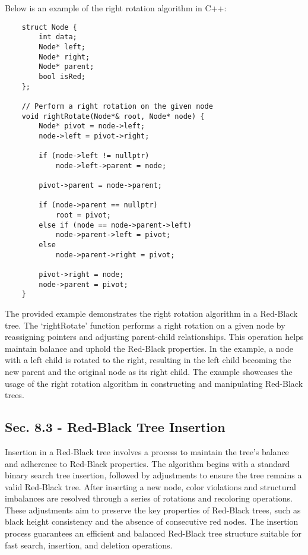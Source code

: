 \begin{solution}

    Below is an example of the right rotation algorithm in C++:

    \horizontalline

    \begin{verbatim}
    struct Node {
        int data;
        Node* left;
        Node* right;
        Node* parent;
        bool isRed;
    };
    
    // Perform a right rotation on the given node
    void rightRotate(Node*& root, Node* node) {
        Node* pivot = node->left;
        node->left = pivot->right;
    
        if (node->left != nullptr)
            node->left->parent = node;
    
        pivot->parent = node->parent;
    
        if (node->parent == nullptr)
            root = pivot;
        else if (node == node->parent->left)
            node->parent->left = pivot;
        else
            node->parent->right = pivot;
    
        pivot->right = node;
        node->parent = pivot;
    }
    \end{verbatim}

    \horizontalline
    
    The provided example demonstrates the right rotation algorithm in a Red-Black tree. The `rightRotate' function performs a right rotation on a given node by reassigning pointers and adjusting parent-child relationships. This operation helps maintain balance and uphold the Red-Black properties. In the example, a node with a left 
    child is rotated to the right, resulting in the left child becoming the new parent and the original node as its right child. The example showcases the usage of the right rotation algorithm in constructing and manipulating Red-Black trees.
\end{solution}

\subsection*{Sec. 8.3 - Red-Black Tree Insertion}

Insertion in a Red-Black tree involves a process to maintain the tree's balance and adherence to Red-Black properties. The algorithm begins with a standard binary search tree insertion, followed by adjustments to ensure the tree remains a valid Red-Black tree. After inserting a new node, color violations and structural imbalances are resolved 
through a series of rotations and recoloring operations. These adjustments aim to preserve the key properties of Red-Black trees, such as black height consistency and the absence of consecutive red nodes. The insertion process guarantees an efficient and balanced Red-Black tree structure suitable for fast search, insertion, and deletion operations.

